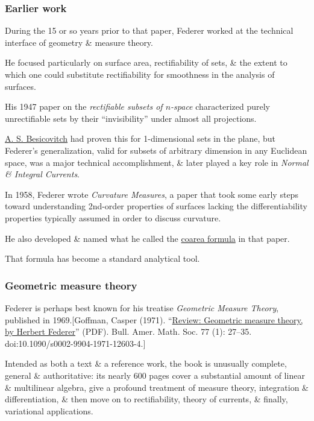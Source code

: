 \documentclass{article}
\begin{document}
\subsubsection{Earlier work}
During the 15 or so years prior to that paper, Federer worked at the technical interface of geometry \& measure theory.

He focused particularly on surface area, rectifiability of sets, \& the extent to which one could substitute rectifiability for smoothness in the analysis of surfaces.

His 1947 paper on the \textit{rectifiable subsets of $n$-space} characterized purely unrectifiable sets by their ``invisibility'' under almost all projections.

\href{https://en.wikipedia.org/wiki/Abram_Samoilovitch_Besicovitch}{A. S. Besicovitch} had proven this for 1-dimensional sets in the plane, but Federer's generalization, valid for subsets of arbitrary dimension in any Euclidean space, was a major technical accomplishment, \& later played a key role in \textit{Normal \& Integral Currents}.

%
In 1958, Federer wrote \textit{Curvature Measures}, a paper that took some early steps toward understanding 2nd-order properties of surfaces lacking the differentiability properties typically assumed in order to discuss curvature.

He also developed \& named what he called the \href{https://en.wikipedia.org/wiki/Coarea_formula}{coarea formula} in that paper.

That formula has become a standard analytical tool.

\subsubsection{Geometric measure theory}
Federer is perhaps best known for his treatise \textit{Geometric Measure Theory}, published in 1969.[Goffman, Casper (1971). ``\href{http://www.ams.org/journals/bull/1971-77-01/S0002-9904-1971-12603-4/S0002-9904-1971-12603-4.pdf}{Review: Geometric measure theory, by Herbert Federer}'' (PDF). Bull. Amer. Math. Soc. 77 (1): 27--35. doi:10.1090/s0002-9904-1971-12603-4.]

Intended as both a text \& a reference work, the book is unusually complete, general \& authoritative: its nearly 600 pages cover a substantial amount of linear \& multilinear algebra, give a profound treatment of measure theory, integration \& differentiation, \& then move on to rectifiability, theory of currents, \& finally, variational applications.
\end{document}
